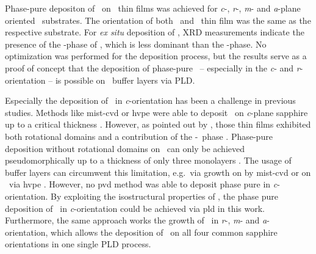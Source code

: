 Phase-pure depositon of \agao\ on \cro\ thin films was achieved for \textit{c}-, \textit{r}-, \textit{m}- and \textit{a}-plane oriented \alo\ substrates.
The orientation of both \cro\ and \agao\ thin film was the same as the respective substrate.
For \textit{ex situ} deposition of \gao, XRD measurements indicate the presence of the \textkappa-phase of \gao, which is less dominant than the \textalpha-phase.
No optimization was performed for the deposition process, but the results serve as a proof of concept that the deposition of phase-pure \agao\ -- especially in the \textit{c}- and \textit{r}-orientation -- is possible on \cro\ buffer layers via PLD.

Especially the deposition of \agao\ in \textit{c}-orientation has been a challenge in previous studies.
Methods like mist-\gls{cvd} or \gls{hvpe} were able to deposit \agao\ on \textit{c}-plane sapphire up to a critical thickness
    \cite{jinno2020}.
However, as pointed out by \textcite{schewski2015}, those thin films exhibited both rotational domains and a contribution of the \textbeta-\gao\ phase
    \cite{shinohara2008,oshima2007}.
Phase-pure deposition without rotational domains on \alo\ can only be achieved pseudomorphically up to a thickness of only three monolayers
    \cite{schewski2015}.
The usage of buffer layers can circumwent this limitation, e.g.\ via growth on  by mist-\gls{cvd}
    \cite{akaiwa2013}
or on \cro\ via \gls{hvpe}
    \cite{polyakov2022,polyakov2022a}.
However, no \gls{pvd} method was able to deposit phase pure \agao in \textit{c}-orientation.
By exploiting the isostructural properties of \cro, the phase pure deposition of \agao\ in \textit{c}-orientation could be achieved via \acrlong{pld} in this work.
Furthermore, the same approach works the growth of \agao\ in \textit{r}-, \textit{m}- and \textit{a}-orientation, which allows the deposition of \agao\ on all four common sapphire orientations in one single PLD process.